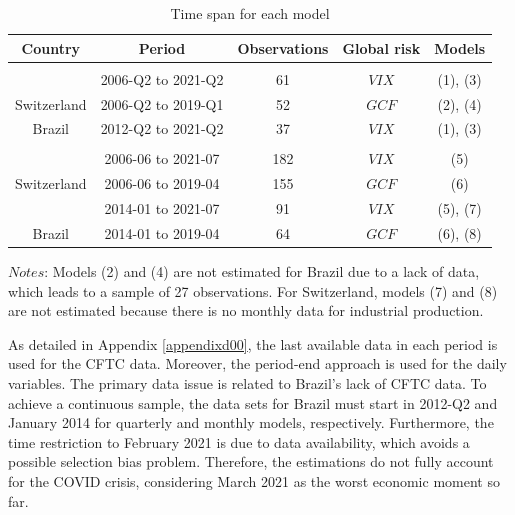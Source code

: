 \documentclass[a4paper, twoside]{templates/ociamthesis}
\begin{document}
\begin{table}[!ht]

\caption{\label{tab:Table521}Time span for each model}
\centering
\begin{threeparttable}
\begin{tabular}[t]{ccccc}
\toprule
Country & Period & Observations & Global risk & Models\\
\midrule
\addlinespace[0.3em]
\multicolumn{5}{l}{\textbf{Quarterly data}}\\
 & 2006-Q2 to 2021-Q2 & 61 & $VIX$ & (1), (3)\\

\multirow{-2}{*}{\centering\arraybackslash \hspace{1em}Switzerland} & 2006-Q2 to 2019-Q1 & 52 & $GCF$ & (2), (4)\\

\hspace{1em}Brazil & 2012-Q2 to 2021-Q2 & 37 & $VIX$ & (1), (3)\\

\addlinespace[0.3em]
\multicolumn{5}{l}{\textbf{Monthly data}}\\
 & 2006-06 to 2021-07 & 182 & $VIX$ & (5)\\

\multirow{-2}{*}{\centering\arraybackslash \hspace{1em}Switzerland} & 2006-06 to 2019-04 & 155 & $GCF$ & (6)\\

 & 2014-01 to 2021-07 & 91 & $VIX$ & (5), (7)\\

\multirow{-2}{*}{\centering\arraybackslash \hspace{1em}Brazil} & 2014-01 to 2019-04 & 64 & $GCF$ & (6), (8)\\
\bottomrule
\end{tabular}
\begin{tablenotes}[para]
\item \footnotesize{$Notes$: Models (2) and (4) are not estimated for Brazil due to a lack of data, which leads to a sample of 27 observations. For Switzerland, models (7) and (8) are not estimated because there is no monthly data for industrial production.}

\end{tablenotes}
\end{threeparttable}
\end{table}

As detailed in Appendix \ref{appendixd00}, the last available data in each period is used for the CFTC data. Moreover, the period-end approach is used for the daily variables. The primary data issue is related to Brazil's lack of CFTC data. To achieve a continuous sample, the data sets for Brazil must start in 2012-Q2 and January 2014 for quarterly and monthly models, respectively. Furthermore, the time restriction to February 2021 is due to data availability, which avoids a possible selection bias problem. Therefore, the estimations do not fully account for the COVID crisis, considering March 2021 as the worst economic moment so far.
\end{document}
